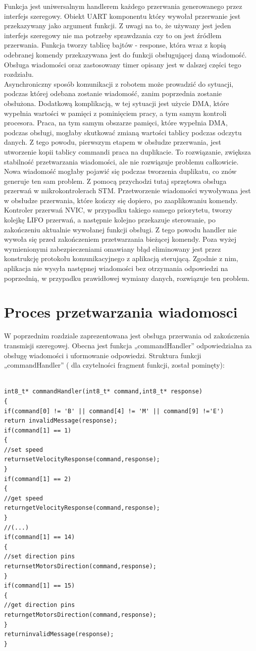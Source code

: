 \documentclass[eng,printmode]{mgr}
\begin{document}
Funkcja jest uniwersalnym handlerem każdego przerwania generowanego przez interfejs szeregowy. Obiekt UART komponentu który wywołał przerwanie jest przekazywany jako argument funkcji. Z uwagi na to, że używany jest jeden interfejs szeregowy nie ma potrzeby sprawdzania czy to on jest źródłem przerwania. Funkcja tworzy tablicę bajtów - response, która wraz z kopią odebranej komendy przekazywana jest do funkcji obsługującej daną wiadomość. Obsługa wiadomości oraz zastosowany timer opisany jest w dalszej części tego rozdziału.
\\Asynchroniczny sposób komunikacji z robotem może prowadzić do sytuacji, podczas której odebana zostanie wiadomość, zanim poprzednia zostanie obsłużona. Dodatkową komplikacją, w tej sytuacji jest użycie DMA, które wypełnia wartości w pamięci z pominięciem pracy, a tym samym kontroli procesora. Praca, na tym samym obszarze pamięci, które wypełnia DMA, podczas obsługi, mogłaby skutkować zmianą wartości tablicy podczas odczytu danych. Z tego powodu, pierwszym etapem w obsłudze przerwania, jest utworzenie kopii tablicy commandi praca na duplikacie. To rozwiązanie, zwiększa stabilność przetwarzania wiadomości, ale nie rozwiązuje problemu całkowicie. Nowa wiadomość mogłaby pojawić się podczas tworzenia duplikatu, co znów generuje ten sam problem. Z pomocą przychodzi tutaj sprzętowa obsługa przerwań w mikrokontrolerach STM. Przetworzenie wiadomości wywoływana jest w obsłudze przerwania, które kończy się dopiero, po zaaplikowaniu komendy. Kontroler przerwań NVIC, w przypadku takiego samego priorytetu, tworzy kolejkę LIFO przerwań, a następnie kolejno przekazuje sterowanie, po zakończeniu aktualnie wywołanej funkcji obsługi. Z tego powodu handler nie wywoła się przed zakończeniem przetwarzania bieżącej komendy. Poza wyżej wymienionymi zabezpieczeniami omawiany błąd eliminowany jest przez konstrukcję protokołu komunikacyjnego z aplikacją sterującą. Zgodnie z nim, aplikacja nie wysyła następnej wiadomości bez otrzymania odpowiedzi na poprzednią, w przypadku prawidłowej wymiany danych, rozwiązuje ten problem.

 \section{Proces przetwarzania wiadomosci}
W poprzednim rozdziale zaprezentowana jest obsługa przerwania od zakończenia transmisji szeregowej. Obecna jest funkcja „commandHandler” odpowiedzialna za obsługę wiadomości i uformowanie odpowiedzi. Struktura  funkcji „commandHandler” ( dla czytelności fragment funkcji, został pominęty):
\begin{lstlisting}[style=c]

int8_t* commandHandler(int8_t* command,int8_t* response)
{
if(command[0] != 'B' || command[4] != 'M' || command[9] !='E')
return invalidMessage(response);
if(command[1] == 1)
{
//set speed
returnsetVelocityResponse(command,response);
}
if(command[1] == 2)
{
//get speed
returngetVelocityResponse(command,response);
}
//(...)
if(command[1] == 14)
{
//set direction pins
returnsetMotorsDirection(command,response);
}
if(command[1] == 15)
{
//get direction pins
returngetMotorsDirection(command,response);
}
returninvalidMessage(response);
}
\end{lstlisting}
\end{document}
